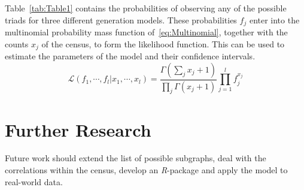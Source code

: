 \documentclass[conference]{IEEEtran}
\begin{document}
Table~\ref{tab:Table1} contains the probabilities of observing any of the possible triads for three different generation models. These probabilities $f_{j}$ enter into the multinomial probability mass function of~\eqref{eq:Multinomial}, together with the counts $x_{j}$ of the census, to form the likelihood function. This can be used to estimate the parameters of the model and their confidence intervals.
\begin{equation}
\mathcal{L}(f_{1}, \cdots, f_{l} | x_{1}, \cdots, x_{l}) = \frac{\Gamma(\sum_{j} x_{j}+1)}{\prod_{j} \Gamma(x_{j}+1)} \prod_{j=1}^{l} f_{j}^{x_{j}}
\label{eq:Multinomial}
\end{equation}

\section{Further Research}

Future work should extend the list of possible subgraphs, deal with the correlations within the census, develop an \mbox{\textit{R}-package} and apply the model to real-world data.



\end{document}
